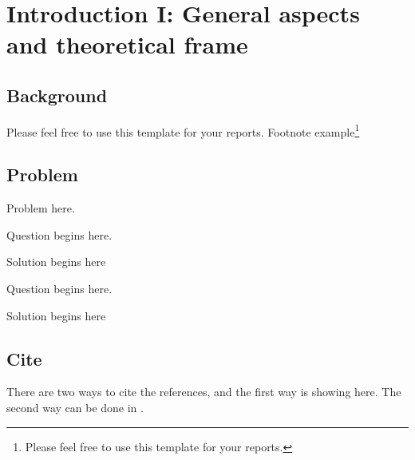 
\chapter{Introduction I: General aspects and theoretical frame}


\section{Background}

Please feel free to use this template for your reports.
Footnote example\footnote{Please feel free to use this template for your reports.}



\section{Problem}

Problem here.

\begin{problem}{1}
    Question begins here.
\end{problem}

\begin{solution}
    Solution begins here
\end{solution}

\begin{problem}{2}
    Question begins here.
\end{problem}

\begin{solution}
    Solution begins here
\end{solution}






\section{Cite}

There are two ways to cite the references, and the first way \citep{nakano1923notes,honda1957mechanism} is showing here. 
The second way can be done in \cite{honda1957mechanism}.



\clearpage